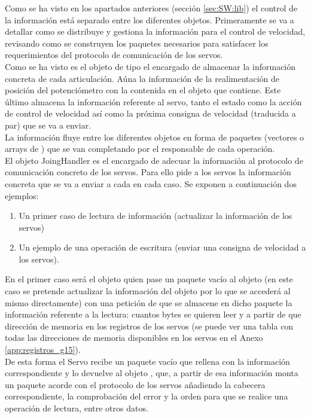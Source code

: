 	Como se ha visto en los apartados anteriores (sección \ref{sec:SW:lib}) el control de la información está separado entre los diferentes objetos. Primeramente se va a detallar como se distribuye y gestiona la información para el control de velocidad, revisando como se construyen los paquetes necesarios para satisfacer los requerimientos del protocolo de comunicación de los servos.
	\\ 
	Como se ha visto es el objeto de tipo  el encargado de almacenar la información concreta de cada articulación. Aúna la información de la realimentación de posición del potenciómetro con la contenida en el objeto  que contiene. Este último almacena la información referente al servo, tanto el estado como la acción de control de velocidad así como la próxima consigna de velocidad (traducida a par) que se va a enviar.
	\\ 
	
	La información fluye entre los diferentes objetos en forma de paquetes (vectores o arrays de ) que se van completando por el responsable de cada operación.
	\\ 

	El objeto JoingHandler es el encargado de adecuar la información al protocolo de comunicación concreto de los servos. Para ello pide a los servos la información concreta que se va a enviar a cada en cada caso. Se exponen a continuación dos ejemplos:
	\begin{enumerate}
		\item Un primer caso de lectura de información (actualizar la información de los servos)
		\item Un ejemplo de una operación de escritura (enviar una consigna de velocidad a los servos).
	\end{enumerate} 
	
	En el primer caso será el objeto  quien pase un paquete vacío al objeto  (en este caso se pretende actualizar la información del objeto  por lo que se accederá al mismo directamente) con una petición de que se almacene en dicho paquete la información referente a la lectura: cuantos bytes se quieren leer y a partir de que dirección de memoria en los registros de los servos (se puede ver una tabla con todas las direcciones de memoria disponibles en los servos en el Anexo \ref{app:registros_g15}).
	\\ 
	
	De esta forma el Servo recibe un paquete vacío que rellena con la información correspondiente y lo devuelve al objeto , que, a partir de esa información monta un paquete acorde con el protocolo de los servos añadiendo la cabecera correspondiente, la comprobación del error y la orden para que se realice una operación de lectura, entre otros datos.
	\\ 
	
